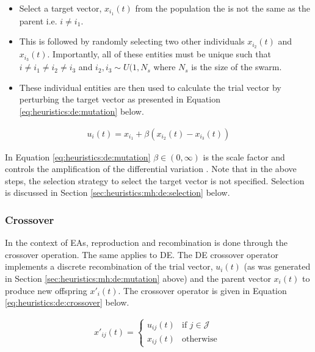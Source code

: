 \begin{itemize}
    \item Select a target vector, $x_{i_{1}}(t)$ from the population the is not the same as the parent i.e. $i \neq i_{1}$.
    \item This is followed by randomly selecting two other individuals $x_{i_{2}}(t)$ and $x_{i_{3}}(t)$. Importantly, all of these entities must be unique such that $i \neq i_{1} \neq i_{2} \neq i_{3}$ and $i_{2}, i_{3} \sim U(1, N_{s}$ where $N_{s}$ is the size of the swarm.
    \item These individual entities are then used to calculate the trial vector by perturbing the target vector as presented in Equation \ref{eq:heuristics:de:mutation} below.
\end{itemize}


\begin{equation}
    \label{eq:heuristics:de:mutation}
    \begin{split}
        u_{i}(t) = x_{i_{1}} + \beta(x_{i_{2}}(t) - x_{i_{3}}(t))
    \end{split}
\end{equation}

In Equation \ref{eq:heuristics:de:mutation} $\beta \in (0, \infty)$ is the scale factor and controls the amplification of the differential variation \cite{ref:engelbrecht:2007}. Note that in the above steps, the selection strategy to select the target vector is not specified. Selection is discussed in Section \ref{sec:heuristics:mh:de:selection} below.


\subsubsection{Crossover}
\label{sec:heuristics:mh:de:crossover}

In the context of \acp{EA}, reproduction and recombination is done through the crossover operation. The same applies to \ac{DE}. The \ac{DE} crossover operator implements a discrete recombination of the trial vector, $u_{i}(t)$ (as was generated in Section \ref{sec:heuristics:mh:de:mutation} above) and the parent vector $x_{i}(t)$ to produce new offspring $x'_{i}(t)$. The crossover operator is given in Equation \ref{eq:heuristics:de:crossover} below.

\begin{equation}
    \label{eq:heuristics:de:crossover}
    \begin{split}
        x'_{ij}(t)= 
        \begin{cases}
            u_{ij}(t) & \text{if } j \in \mathcal{J} \\
            x_{ij}(t)   & \text{otherwise }
        \end{cases}
    \end{split}
\end{equation}

